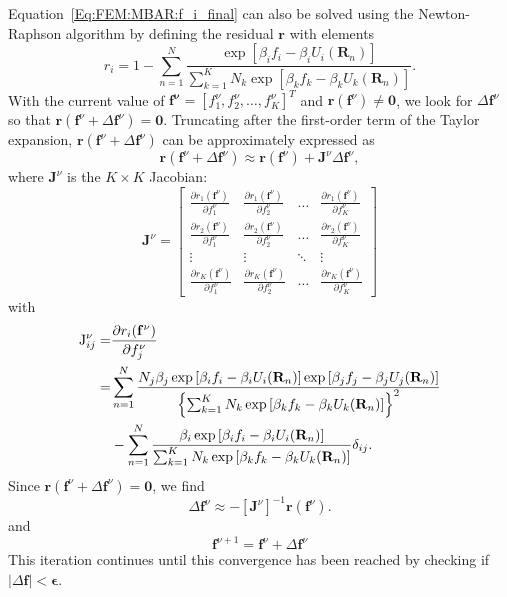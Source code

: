 Equation~\ref{Eq:FEM:MBAR:f_i_final} can also be solved using the Newton-Raphson algorithm by defining the residual $\mathbf{r}$ with elements
\begin{equation}
    r_i=1-\sum_{n=1}^{N}\frac{\exp{\left[\beta_i f_i-\beta_i U_i(\mathbf{R}_n)\right]}}{\sum_{k=1}^{K}N_k\exp{\left[\beta_kf_k-\beta_kU_k(\mathbf{R}_n)\right]}}.
\end{equation}
With the current value of $\mathbf{f^\nu}=[f_1^\nu,f_2^\nu,\dots,f_K^\nu]^T$ and $\mathbf{r}(\mathbf{f}^\nu)\neq \mathbf{0}$, we look for $\Delta \mathbf{f}^\nu$ so that $\mathbf{r}(\mathbf{f}^\nu+\Delta \mathbf{f}^\nu)=\mathbf{0}$. Truncating after the first-order term of the Taylor expansion, $\mathbf{r}(\mathbf{f}^\nu+\Delta \mathbf{f}^\nu)$ can be approximately expressed as
\begin{equation}
    \mathbf{r}(\mathbf{f}^\nu+\Delta \mathbf{f}^\nu)\approx \mathbf{r}(\mathbf{f}^\nu) + \mathbf{J}^\nu\Delta \mathbf{f}^\nu,
\end{equation}
where $\mathbf{J}^\nu$ is the $K\times K$ Jacobian:
\begin{equation}
    \mathbf{J}^\nu=\begin{bmatrix}
        \frac{\partial r_1(\mathbf{f}^\nu)}{\partial f_1^\nu}&\frac{\partial r_1(\mathbf{f}^\nu)}{\partial f_2^\nu}&\dots& \frac{\partial r_1(\mathbf{f}^\nu)}{\partial f_K^\nu}\\
        \frac{\partial r_2(\mathbf{f}^\nu)}{\partial f_1^\nu}&\frac{\partial r_2(\mathbf{f}^\nu)}{\partial f_2^\nu}&\dots& \frac{\partial r_2(\mathbf{f}^\nu)}{\partial f_K^\nu}\\
        \vdots&\vdots&\ddots&\vdots\\
        \frac{\partial r_K(\mathbf{f}^\nu)}{\partial f_1^\nu}&\frac{\partial r_K(\mathbf{f}^\nu)}{\partial f_2^\nu}&\dots& \frac{\partial r_K(\mathbf{f}^\nu)}{\partial f_K^\nu}
    \end{bmatrix}
\end{equation}
with
\begin{align}
	\mathrm{J}^\nu_{ij}=&\frac{\partial r_i(\mathbf{f}^\nu)}{\partial f_j^\nu}\notag\\
	                   =&\sum_{n=1}^N\frac{N_j\beta_j\exp{\left[\beta_i f_i-\beta_i U_i(\mathbf{R}_n)\right]}\exp{\left[\beta_j f_j-\beta_j U_j(\mathbf{R}_n)\right]}}{\left\{\sum_{k=1}^K N_k\exp{\left[\beta_kf_k-\beta_kU_k(\mathbf{R}_n)\right]}\right\}^2}\notag\\
	                    &-\sum_{n=1}^N\frac{\beta_i\exp{\left[\beta_i f_i-\beta_i U_i(\mathbf{R}_n)\right]}}{\sum_{k=1}^K N_k\exp{\left[\beta_kf_k-\beta_kU_k(\mathbf{R}_n)\right]}}\delta_{ij}.
\end{align}
Since $\mathbf{r}(\mathbf{f}^\nu+\Delta \mathbf{f}^\nu)=\mathbf{0}$, we find
\begin{equation}
    \Delta \mathbf{f}^\nu\approx -\left[\mathbf{J}^\nu\right]^{-1}\mathbf{r}(\mathbf{f}^\nu).
\end{equation}
and
\begin{equation}
    \mathbf{f}^{\nu+1}=\mathbf{f}^\nu+\Delta \mathbf{f}^\nu
\end{equation}
This iteration continues until this convergence has been reached by checking if $|\Delta \mathbf{f}|<\boldsymbol{\epsilon}$.


